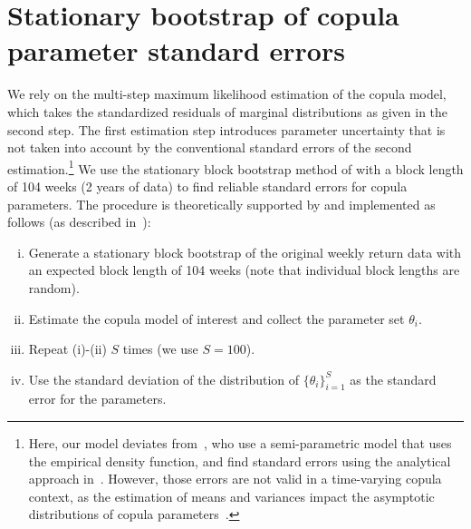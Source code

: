
\section{Stationary bootstrap of copula parameter standard errors}
\label{app:Appendix_bootstrap}

We rely on the multi-step maximum likelihood estimation of the copula model, which takes the standardized residuals of marginal distributions as given in the second step. The first estimation step introduces parameter uncertainty that is not taken into account by the conventional standard errors of the second estimation.\footnote{Here, our model deviates from~\textcite{ChristoffersenLanglois2013}, who use a semi-parametric model that uses the empirical density function, and find standard errors using the analytical approach in~\textcite{ChenFan2006}. However, those errors are not valid in a time-varying copula context, as the estimation of means and variances impact the asymptotic distributions of copula parameters~\autocite{Remillard2010}.} We use the stationary block bootstrap method of \textcite{PolitisRomano1994} with a block length of 104 weeks (2 years of data) to find reliable standard errors for copula parameters. The procedure is theoretically supported by \textcite{GonclavesWhite2004} and implemented as follows (as described in~\textcite{Patton2012}):
\begin{enumerate}[(i)]
    \item Generate a stationary block bootstrap of the original weekly return data with an expected block length of 104 weeks (note that individual block lengths are random).
    \item Estimate the copula model of interest and collect the parameter set $\theta_i$.
    \item Repeat (i)-(ii) $S$ times (we use $S = 100$).
    \item Use the standard deviation of the distribution of $\{\theta_i\}_{i=1}^S$ as the standard error for the parameters.
\end{enumerate}
